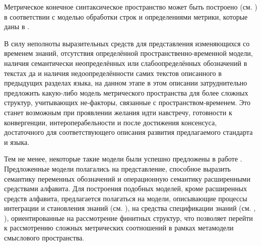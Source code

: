 Метрическое конечное синтаксическое пространство может быть построено (см. ) в соответствии с моделью обработки строк и определениями метрики, которые даны в .

\begin{SCn}
\end{SCn}

\begin{SCn}
\end{SCn}

\begin{SCn}
\end{SCn}

В силу неполноты выразительных средств для представления изменяющихся со временем знаний, отсутствия определённой пространственно-временной модели, наличия семантически неопределённых или слабоопределённых обозначений в текстах да и наличия недоопределённости самих текстов описанного в предыдущих разделах языка, на данном этапе в этом описании затруднительно предложить какую-либо модель метрического пространства для более сложных структур, учитывающих не‑факторы, связанные с пространством‑временем. Это станет возможным при проявлении желания идти навстречу, готовности к конвергенции, интероперабельности и после достижения консенсуса, достаточного для соответствующего описания развития предлагаемого стандарта и языка.

Тем не менее, некоторые такие модели были успешно предложены в работе . Предложенные модели полагались на представление, способное выразить семантику переменных обозначений и операционную семантику расширенными средствами алфавита. Для построения подобных моделей, кроме расширенных средств алфавита, предлагается полагаться на модели, описывающие процессы интеграции и становления знаний (см. ), на средства спецификации знаний (см. , ), ориентированные на рассмотрение финитных структур, что позволяет перейти к рассмотрению сложных метрических соотношений в рамках метамодели смыслового пространства.

